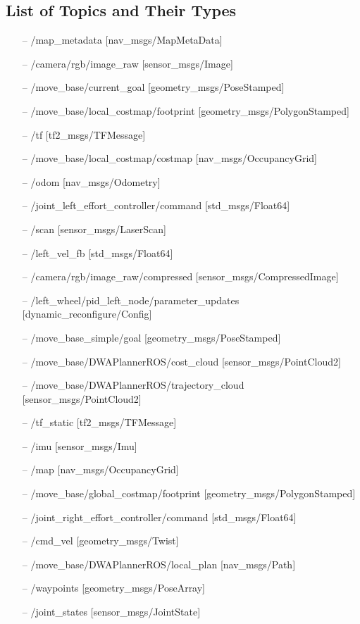 \documentclass[12]{article}
\begin{document}
\subsection{List of Topics and Their Types}

\begin{itemize}
\item[--] /map\_metadata [nav\_msgs/MapMetaData]
\item[--] /camera/rgb/image\_raw [sensor\_msgs/Image]
\item[--] /move\_base/current\_goal [geometry\_msgs/PoseStamped]
\item[--] /move\_base/local\_costmap/footprint [geometry\_msgs/PolygonStamped]
\item[--] /tf [tf2\_msgs/TFMessage]
\item[--] /move\_base/local\_costmap/costmap [nav\_msgs/OccupancyGrid]
\item[--] /odom [nav\_msgs/Odometry]
\item[--] /joint\_left\_effort\_controller/command [std\_msgs/Float64]
\item[--] /scan [sensor\_msgs/LaserScan]
\item[--] /left\_vel\_fb [std\_msgs/Float64]
\item[--] /camera/rgb/image\_raw/compressed [sensor\_msgs/CompressedImage]
\item[--] /left\_wheel/pid\_left\_node/parameter\_updates [dynamic\_reconfigure/Config]
\item[--] /move\_base\_simple/goal [geometry\_msgs/PoseStamped]
\item[--] /move\_base/DWAPlannerROS/cost\_cloud [sensor\_msgs/PointCloud2]
\item[--] /move\_base/DWAPlannerROS/trajectory\_cloud [sensor\_msgs/PointCloud2]
\item[--] /tf\_static [tf2\_msgs/TFMessage]
\item[--] /imu [sensor\_msgs/Imu]
\item[--] /map [nav\_msgs/OccupancyGrid]
\item[--] /move\_base/global\_costmap/footprint [geometry\_msgs/PolygonStamped]
\item[--] /joint\_right\_effort\_controller/command [std\_msgs/Float64]
\item[--] /cmd\_vel [geometry\_msgs/Twist]
\item[--] /move\_base/DWAPlannerROS/local\_plan [nav\_msgs/Path]
\item[--] /waypoints [geometry\_msgs/PoseArray]
\item[--] /joint\_states [sensor\_msgs/JointState]

\end{itemize}
\end{document}
